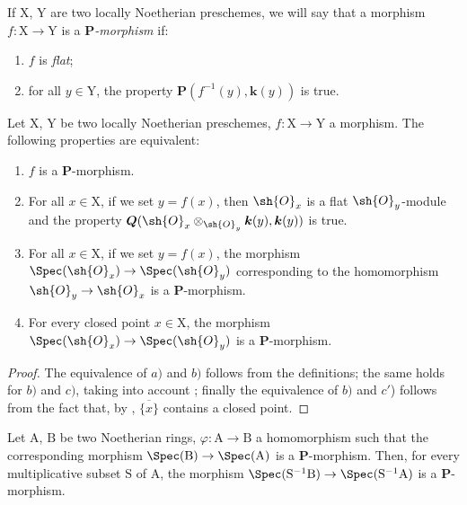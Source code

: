 
If $\mathrm{X}$, $\mathrm{Y}$ are two locally Noetherian preschemes, we will say that a morphism $f:\mathrm{X}\to\mathrm{Y}$ is a \emph{$\boldsymbol{P}$-morphism} if:
\begin{enumerate}[label=\arabic{enumi}\textsuperscript{o}]
  \item $f$ is \emph{flat};
  \item for all $y\in\mathrm{Y}$, the property $\boldsymbol{P}(f^{-1}(y),\boldsymbol{k}(y))$ is true.
\end{enumerate}

\begin{lemma}[7.3.2]
\label{IV.7.3.2}
Let $\mathrm{X}$, $\mathrm{Y}$ be two locally Noetherian preschemes, $f:\mathrm{X}\to\mathrm{Y}$ a morphism.
The following properties are equivalent:
\begin{enumerate}[label=\emph{\alph*)}]
  \item $f$ is a $\boldsymbol{P}$-morphism.
  \item For all $x\in\mathrm{X}$, if we set $y=f(x)$, then $\sh{O}_x$ is a flat $\sh{O}_y$-module and the property $\boldsymbol{Q}(\sh{O}_x\otimes_{\sh{O}_y}\boldsymbol{k}(y),\boldsymbol{k}(y))$ is true.
  \item For all $x\in\mathrm{X}$, if we set $y=f(x)$, the morphism $\Spec(\sh{O}_x)\to\Spec(\sh{O}_y)$ corresponding to the homomorphism $\sh{O}_y\to\sh{O}_x$ is a $\boldsymbol{P}$-morphism.
  \item[\emph{c$'$)}] For every closed point $x\in\mathrm{X}$, the morphism $\Spec(\sh{O}_x)\to\Spec(\sh{O}_y)$ is a $\boldsymbol{P}$-morphism.
\end{enumerate}
\end{lemma}

\begin{proof}
The equivalence of $a)$ and $b)$ follows from the definitions; the same holds for $b)$ and $c)$, taking into account ; finally the equivalence of $b)$ and $c'$) follows from the fact that, by , $\overline{\{x\}}$ contains a closed point.
\end{proof}

\begin{corollary}[7.3.3]
\label{IV.7.3.3}
Let $\mathrm{A}$, $\mathrm{B}$ be two Noetherian rings, $\varphi:\mathrm{A}\to\mathrm{B}$ a homomorphism such that the corresponding morphism $\Spec(\mathrm{B})\to\Spec(\mathrm{A})$ is a $\boldsymbol{P}$-morphism.
Then, for every multiplicative subset $\mathrm{S}$ of $\mathrm{A}$, the morphism $\Spec(\mathrm{S}^{-1}\mathrm{B})\to\Spec(\mathrm{S}^{-1}\mathrm{A})$ is a $\boldsymbol{P}$-morphism.
\end{corollary}

